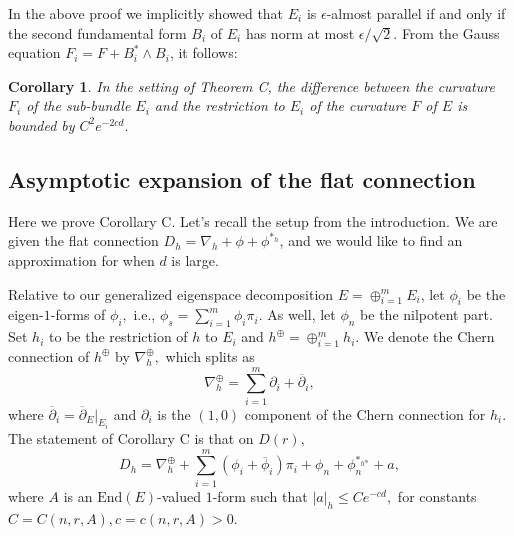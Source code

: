 \documentclass[10pt]{amsart}
\newtheorem{cor}[thm]{Corollary}
\theoremstyle{definition}
\begin{document}
In the above proof we implicitly showed that $E_i$ is $\epsilon$-almost parallel if and only if the second fundamental form $B_i$ of $E_i$ has norm at most $\epsilon/\sqrt{2}$. From the Gauss equation $F_i = F + B_i^* \wedge B_i$, it follows: 

\begin{cor} \label{cor: curvature of sub-bundles} In the setting of Theorem C, the difference between the curvature $F_i$ of the sub-bundle $E_i$ and the restriction to $E_i$ of the curvature $F$ of $E$ is bounded by $C^2e^{-2cd}.$ 
\end{cor}


\subsection{Asymptotic expansion of the flat connection}
Here we prove Corollary C. Let's recall the setup from the introduction. We are given the flat connection $D_h=\nabla_h+\phi+\phi^{*_h}$, and we would like to find an approximation for when $d$ is large.

Relative to our generalized eigenspace decomposition $E=\oplus_{i=1}^m E_i$, let $\phi_i$ be the eigen-$1$-forms of $\phi_i,$ i.e., $\phi_s=\sum_{i=1}^m \phi_i\pi_i.$ As well, let $\phi_n$ be the nilpotent part. Set $h_i$ to be the restriction of $h$ to $E_i$ and $h^{\oplus}=\oplus_{i=1}^m h_i.$ We denote the Chern connection of $h^{\oplus}$ by $\nabla_h^{\oplus},$ which splits as $$\nabla_h^{\oplus}= \sum_{i=1}^m \partial_i + \overline{\partial}_i,$$ where $\overline{\partial}_i=\overline{\partial}_E|_{E_i}$  and $\partial_i$ is the $(1,0)$ component of the Chern connection for $h_i.$ The statement of Corollary C is that on $D(r),$
\begin{equation}\label{asymptotic2}
    D_h = \nabla_{h}^{\oplus}+\sum_{i=1}^m(\phi_i+\overline{\phi}_i)\pi_i+ \phi_n +\phi_n^{*_{h^{\oplus}}}+a,
\end{equation}
where $A$ is an $\textrm{End}(E)$-valued $1$-form such that $|a|_{h}\leq Ce^{-cd},$ for constants
$C=C(n,r,A), c=c(n,r,A)>0$.
\end{document}
